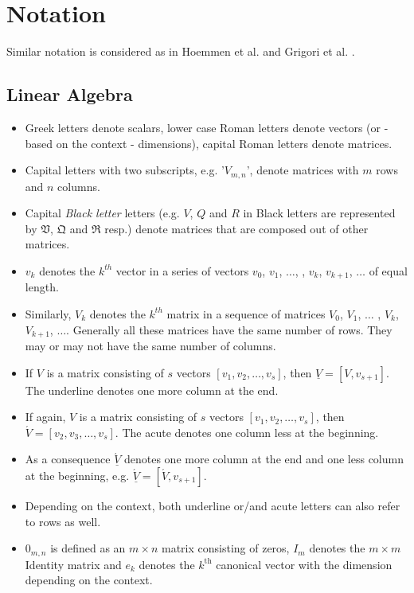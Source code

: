 \documentclass{scrartcl}
\numberwithin{equation}{section}
\begin{document}
\pagebreak

\tableofcontents

\pagebreak

\section{Notation}
Similar notation is considered as in Hoemmen et al. \cite{Hoemmen:2010:CKS:1970638} and Grigori et al. \cite{Grigori}.
\subsection*{Linear Algebra}
\begin{itemize}
\item Greek letters denote scalars, lower case Roman letters denote vectors (or - based on the context - dimensions), capital Roman letters denote matrices.
\item Capital letters with two subscripts, e.g. '$V_{m, n}$', denote matrices with $m$ rows and $n$ columns.
\item Capital \textit{Black letter} letters (e.g. $V$, $Q$ and $R$ in Black letters are represented by $\mathfrak{V}$, $\mathfrak{Q}$ and $\mathfrak{R}$ resp.) denote matrices that are composed out of other matrices. 
\item $v_k$ denotes the $k^{th}$ vector in a series of vectors $v_0$, $v_1$, $\ldots$, ,  $v_k$, $v_{k+1}$, $\ldots$ of equal length.
\item Similarly, $V_k$ denotes the $k^{th}$ matrix in a sequence of matrices $V_0$, $V_1$, $\ldots$ , $V_k$, $V_{k+1}$, $\ldots$. Generally all these matrices have the same number of rows. They may or may not have the same number of columns.
\item If $V$ is a matrix consisting of $s$ vectors $\left[v_1, v_2, \ldots, v_s\right]$, then $\underline{V} = \left[V, v_{s+1} \right]$. The underline denotes one more column at the end.
\item If again, $V$ is a matrix consisting of $s$ vectors $\left[v_1, v_2, \ldots, v_s\right]$, then $\acute{V} = [v_2, v_3, \ldots, v_s]$. The acute denotes one column less at the beginning.
\item As a consequence $\underline{\acute{V}}$ denotes one more column at the end and one less column at the beginning, e.g. $\underline{\acute{V}} = [\acute{V}, v_{s+1}]$.
\item Depending on the context, both underline or/and acute letters can also refer to rows as well. 
\item $0_{m, n}$ is defined as an $m \times n$ matrix consisting of zeros, $I_{m}$ denotes the $m \times m$ Identity matrix and $e_k$ denotes the $k^{\text{th}}$ canonical vector with the dimension depending on the context.

\end{itemize}
\end{document}
